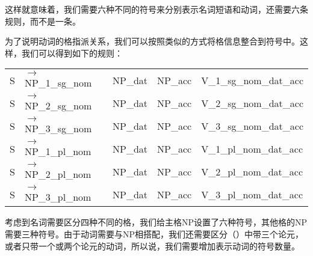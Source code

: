 \z
这样就意味着，我们需要六种不同的符号来分别表示名词短语和动词，还需要六条规则，而不是一条。

为了说明动词的格指派关系，我们可以按照类似的方式将格信息整合到符号中。这样，我们可以得到如下的规则：
\ea
\label{ditrans-ps-regeln}
\begin{tabular}[t]{@{}l@{ }l@{~~}l@{~~}l@{~~}l}
S  & $\to$ NP\_1\_sg\_nom & NP\_dat & NP\_acc & V\_1\_sg\_nom\_dat\_acc\\
S  & $\to$ NP\_2\_sg\_nom & NP\_dat & NP\_acc & V\_2\_sg\_nom\_dat\_acc\\
S  & $\to$ NP\_3\_sg\_nom & NP\_dat & NP\_acc & V\_3\_sg\_nom\_dat\_acc\\
S  & $\to$ NP\_1\_pl\_nom & NP\_dat & NP\_acc & V\_1\_pl\_nom\_dat\_acc\\
S  & $\to$ NP\_2\_pl\_nom & NP\_dat & NP\_acc & V\_2\_pl\_nom\_dat\_acc\\
S  & $\to$ NP\_3\_pl\_nom & NP\_dat & NP\_acc & V\_3\_pl\_nom\_dat\_acc\\
\end{tabular}
\z
考虑到名词需要区分四种不同的格，我们给主格NP设置了六种符号，其他格的NP需要三种符号。由于动词需要与NP相搭配，我们还需要区分（）中带三个论元，或者只带一个或两个论元的动词，所以说，我们需要增加表示动词的符号数量。
\eal
{}
